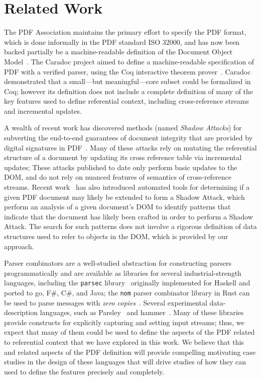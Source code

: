 \section{Related Work}
\label{sec:rel-work}

The PDF Association maintains the primary effort to specify the PDF
format, which is done informally in the PDF standard ISO 32000, and has now
been backed partially be a machine-readable definition of the Document
Object Model~\cite{wyatt2021work}.
%
The Caradoc project aimed to define a machine-readable specification
of PDF with a verified parser, using the Coq interactive theorem
prover~\cite{g.endignouxCaradocPragmaticApproach2016}.
%
Caradoc demonstrated that a small---but meaningful---core subset could
be formalized in Coq;
%
however its definition does not include a complete definition of many
of the key features used to define referential context, including
cross-reference streams and incremental updates.

A wealth of recent work has discovered methods (named \emph{Shadow
  Attacks}) for subverting the end-to-end guarantees of document
integrity that are provided by digital signatures in
PDF~\cite{mullerPracticalDecryptionExFiltration2019,mladenovTrillionDollarRefund2019,mullerProcessingDangerousPaths2021,ndsssymposiumNDSS2021Shadow2021,rohlmannBreakingSpecificationPDF2021}.
%
Many of these attacks rely on mutating the referential structure of a
document by updating its cross reference table via incremental
updates;
%
These attacks published to date only perform basic
updates to the DOM, and do not rely on nuanced features of semantics
of cross-reference streams.
%
Recent work~\cite{itextShadowAttack} has also introduced automated
tools for determining if a given PDF document may likely be extended
to form a Shadow Attack, which perform an analysis of a given
document's DOM to identify patterns that indicate that the document
has likely been crafted in order to perform a Shadow Attack.
%
The search for such patterns does not involve a rigorous definition of
data structures used to refer to objects in the DOM, which is provided
by our approach.

Parser combinators are a well-studied abstraction for constructing
parsers programmatically and are available as libraries for several
industrial-strength languages, including the \texttt{parsec}
library~\cite{leijen2001parsec} originally implemented for Haskell and
ported to go, F\#, C\#, and Java;
%
the \texttt{nom} parser combinator library in Rust can be used to
parse messages with \emph{zero copies}~\cite{couprie2015nom}.
%
Several experimental data-description languages, such as
Parsley~\cite{mundkurResearchReportParsley2020} and
hammer~\cite{bratus2017curing}.
%
Many of these libraries provide constructs for explicitly capturing
and setting input streams;
%
thus, we expect that many of them could be used to define the aspects
of the PDF related to referential context that we have explored in
this work.
%
We believe that this and related aspects of the PDF definition will
provide compelling motivating case studies in the design of these
languages that will drive studies of how they can used to define the
features precisely and completely.
